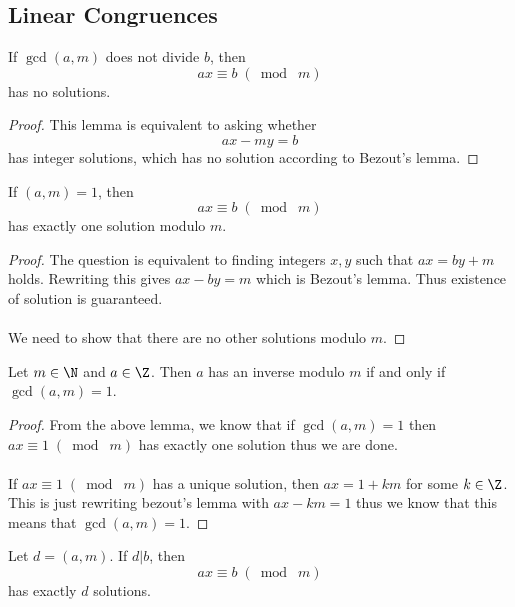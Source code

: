 \subsection{Linear Congruences}
\begin{lmm}{}{} If $\gcd(a,m)$ does not divide $b$, then $$ax\equiv b\;(\bmod\;m)$$ has no solutions. \tcbline
\begin{proof}
This lemma is equivalent to asking whether $$ax-my=b$$ has integer solutions, which has no solution according to Bezout's lemma. 
\end{proof}
\end{lmm}

\begin{lmm}{}{} If $(a,m)=1$, then $$ax\equiv b\;(\bmod\;m)$$ has exactly one solution modulo $m$. \tcbline
\begin{proof}
The question is equivalent to finding integers $x,y$ such that $ax=by+m$ holds. Rewriting this gives $ax-by=m$ which is Bezout's lemma. Thus existence of solution is guaranteed. \\~\\
We need to show that there are no other solutions modulo $m$. 
\end{proof}
\end{lmm}

\begin{crl}{}{} Let $m\in\N$ and $a\in\Z$. Then $a$ has an inverse modulo $m$ if and only if $\gcd(a,m)=1$. \tcbline
\begin{proof} From the above lemma, we know that if $\gcd(a,m)=1$ then $ax\equiv 1\;(\bmod\;m)$ has exactly one solution thus we are done. \\~\\
If $ax\equiv 1\;(\bmod\;m)$ has a unique solution, then $ax=1+km$ for some $k\in\Z$. This is just rewriting bezout's lemma with $ax-km=1$ thus we know that this means that $\gcd(a,m)=1$. 
\end{proof}
\end{crl}

\begin{lmm}{}{} Let $d=(a,m)$. If $d|b$, then $$ax\equiv b\;(\bmod\;m)$$ has exactly $d$ solutions. 
\end{lmm}


